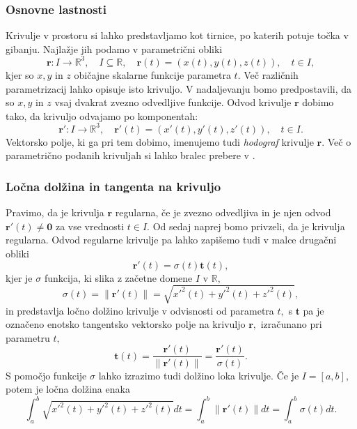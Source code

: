 \documentclass[12pt,a4paper,twoside]{article}
\theoremstyle{definition} %
\theoremstyle{plain} %
\theoremstyle{primerstyle}
\numberwithin{equation}{section}  %
\newcommand{\R}{\mathbb R}
\newcommand{\tV}{\mathbf{t}}
\newcommand{\rV}{\mathbf{r}}
\begin{document}
\subsubsection{Osnovne lastnosti}

Krivulje v prostoru si lahko predstavljamo kot tirnice, po katerih potuje točka v gibanju. Najlažje jih podamo
v parametrični obliki
\begin{equation*}
\rV:I \to \R^3,\quad I \subseteq \R, \quad \rV(t)=(x(t),y(t),z(t)), \quad t \in I,
\end{equation*}
kjer so 
$x,y$ in $z$ običajne skalarne funkcije parametra $t.$ Več različnih parametrizacij lahko opisuje
isto krivuljo. V nadaljevanju bomo predpostavili, da so $x,y$ in $z$ vsaj dvakrat zvezno odvedljive funkcije.
Odvod krivulje $\rV$ dobimo tako, da krivuljo odvajamo po komponentah:
$$\rV':I \to \R^3, \quad \rV'(t)=(x'(t),y'(t),z'(t)), \quad t \in I.$$
Vektorsko polje, ki ga pri tem dobimo, imenujemo tudi \textit{hodograf} krivulje $\rV.$ Več o parametrično podanih krivuljah si lahko bralec prebere v \cite{struik1961lectures}.

\subsubsection{Ločna dolžina in tangenta na krivuljo}

Pravimo, da je krivulja $\rV$ regularna, če je zvezno odvedljiva in je njen odvod $\rV'(t) \neq \bm{0}$ za vse vrednosti $t \in I.$ Od sedaj naprej bomo privzeli, da je krivulja regularna. Odvod regularne krivulje pa lahko zapišemo tudi v malce drugačni obliki
\begin{equation}
	\label{eq2_1}
	\rV'(t)=\sigma(t)\tV(t),
\end{equation}
kjer je $\sigma$ funkcija, ki slika z začetne domene $I$ v $\R,$
\begin{equation}
	\sigma(t)=\lVert \rV'(t)\rVert=\sqrt{x'^2(t)+y'^2(t)+z'^2(t)},
\end{equation}
in predstavlja ločno dolžino krivulje v odvisnosti od parametra $t,$ s $\tV$ pa je označeno enotsko tangentsko vektorsko polje na krivuljo $\rV,$ izračunano pri parametru $t,$
\begin{equation}
	\label{enotski_tangentni_vektor}
	\tV(t)=\frac{\rV'(t)}{\lVert \rV'(t) \rVert}=
	\frac{\rV'(t)}{\sigma(t)}.
\end{equation}
S pomočjo funkcije $\sigma$ lahko izrazimo tudi dolžino loka krivulje. Če je $I=[a,b],$ potem je ločna dolžina enaka
\begin{equation}
	\int_a^b\sqrt{x'^2(t)+y'^2(t)+z'^2(t)}dt=\int_a^b\lVert \rV'(t) \rVert dt =\int_a^b\sigma(t)dt.
\end{equation}
\end{document}
